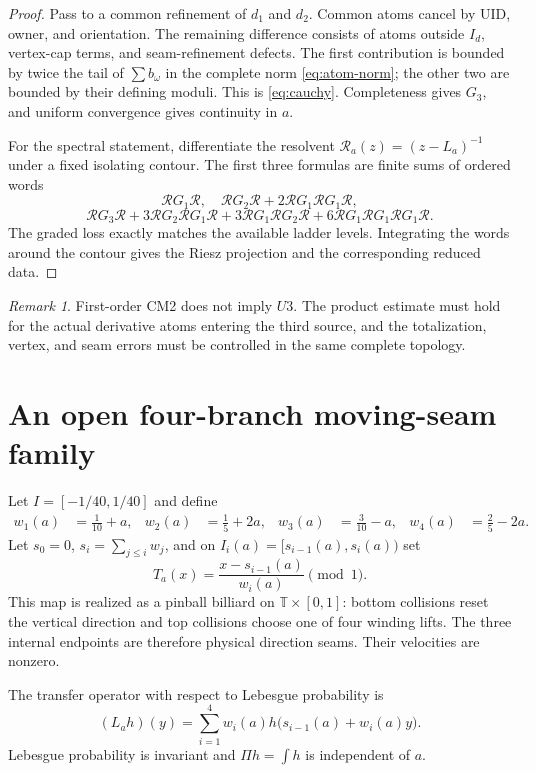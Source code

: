 \documentclass[11pt,reqno]{amsart}
\theoremstyle{definition}
\theoremstyle{remark}
\newtheorem{remark}[theorem]{Remark}
\newcommand{\T}{\mathbb T}
\newcommand{\cR}{\mathscr R}
\begin{document}
\begin{proof}
Pass to a common refinement of $d_1$ and $d_2$.  Common atoms cancel by UID,
owner, and orientation.  The remaining difference consists of atoms outside
$I_d$, vertex-cap terms, and seam-refinement defects.  The first contribution
is bounded by twice the tail of $\sum b_\omega$ in the complete norm
\eqref{eq:atom-norm}; the other two are bounded by their defining moduli.  This
is \eqref{eq:cauchy}.  Completeness gives $G_3$, and uniform convergence gives
continuity in $a$.

For the spectral statement, differentiate the resolvent
$\cR_a(z)=(z-L_a)^{-1}$ under a fixed isolating contour.  The first three
formulas are finite sums of ordered words
\[
 \cR G_1\cR,
 \quad
 \cR G_2\cR+2\cR G_1\cR G_1\cR,
\]
\[
 \cR G_3\cR+3\cR G_2\cR G_1\cR
 +3\cR G_1\cR G_2\cR
 +6\cR G_1\cR G_1\cR G_1\cR.
\]
The graded loss exactly matches the available ladder levels.  Integrating the
words around the contour gives the Riesz projection and the corresponding
reduced data.
\end{proof}

\begin{remark}
First-order CM2 does not imply $U3$.  The product estimate must hold for the
actual derivative atoms entering the third source, and the totalization,
vertex, and seam errors must be controlled in the same complete topology.
\end{remark}

\section{An open four-branch moving-seam family}\label{sec:fourbranch}

Let $I=[-1/40,1/40]$ and define
\begin{align}\label{eq:weights}
 w_1(a)&=\frac1{10}+a,&
 w_2(a)&=\frac15+2a,&
 w_3(a)&=\frac3{10}-a,&
 w_4(a)&=\frac25-2a.
\end{align}
Let $s_0=0$, $s_i=\sum_{j\le i}w_j$, and on
$I_i(a)=[s_{i-1}(a),s_i(a))$ set
\begin{equation}\label{eq:fullbranch}
 T_a(x)=\frac{x-s_{i-1}(a)}{w_i(a)}\pmod1.
\end{equation}
This map is realized as a pinball billiard on
$\T\times[0,1]$: bottom collisions reset the vertical direction and top
collisions choose one of four winding lifts.  The three internal endpoints are
therefore physical direction seams.  Their velocities are nonzero.

The transfer operator with respect to Lebesgue probability is
\begin{equation}\label{eq:transfer-four}
 (L_a h)(y)=\sum_{i=1}^4w_i(a)
 h\bigl(s_{i-1}(a)+w_i(a)y\bigr).
\end{equation}
Lebesgue probability is invariant and $\Pi h=\int h$ is independent of $a$.
\end{document}
